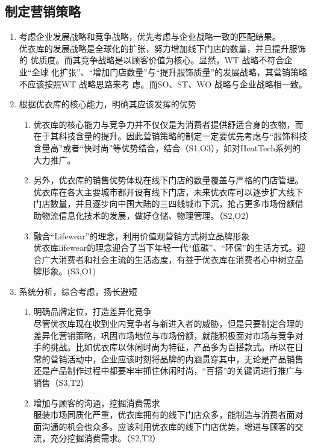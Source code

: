 \documentclass{xjtureport}
\begin{document}
\subsection{制定营销策略}
\begin{enumerate}
    \item 考虑企业发展战略和竞争战略，优先考虑与企业战略一致的匹配结果。\\
    优衣库的发展战略是全球化的扩张，努力增加线下门店的数量，并且提升服饰的
    优质度。而其竞争战略是以顾客价值为核心。显然，WT 战略不符合企业“全球
    化扩张”、“增加门店数量”与“提升服饰质量”的发展战略，其营销策略不应该按照WT 战略思路来考
    虑。而SO、ST、WO 战略与企业战略相一致。
    \item 根据优衣库的核心能力，明确其应该发挥的优势
    \begin{enumerate}
        \item 优衣库的核心能力与竞争力并不仅仅是为消费者提供舒适合身的衣物，而在于其科技含量的提升。因此营销策略的制定一定要优先考虑与“服饰科技含量高”或者“快时尚”等优势结合，结合（S1,O3），如对HeatTech系列的大力推广。
        \item 另外，优衣库的销售优势体现在线下门店的数量覆盖与严格的门店管理。优衣库在各大主要城市都开设有线下门店，未来优衣库可以逐步扩大线下门店数量，并且逐步向中国大陆的三四线城市下沉，抢占更多市场份额借助物流信息化技术的发展，做好仓储、物理管理。（S2,O2）
        \item 融合“Lifewear”的理念，利用价值观营销方式树立品牌形象\\
        优衣库lifewear的理念迎合了当下年轻一代“低碳”、“环保”的生活方式。迎合广大消费者和社会主流的生活态度，有益于优衣库在消费者心中树立品牌形象。(S3,O1)
    \end{enumerate}
    \item 系统分析，综合考虑，扬长避短
    \begin{enumerate}
        \item 明确品牌定位，打造差异化竞争\\
        尽管优衣库现在收到业内竞争者与新进入者的威胁，但是只要制定合理的差异化营销策略，巩固市场地位与市场份额，就能积极面对市场与竞争对手的挑战。比如优衣库以休闲时尚为特征，产品多为百搭款式。所以在日常的营销活动中，企业应该时刻将品牌的内涵贯穿其中，无论是产品销售还是产品制作过程中都要牢牢抓住休闲时尚，“百搭”的关键词进行推广与销售（S3,T2）
        \item 增加与顾客的沟通，挖掘消费需求\\
        服装市场同质化严重，优衣库拥有的线下门店众多，能制造与消费者面对面沟通的机会也众多。应该利用优衣库的线下门店优势，增进与顾客的交流，充分挖掘消费需求。（S2,T2）
    \end{enumerate}
    
\end{enumerate}
\end{document}
